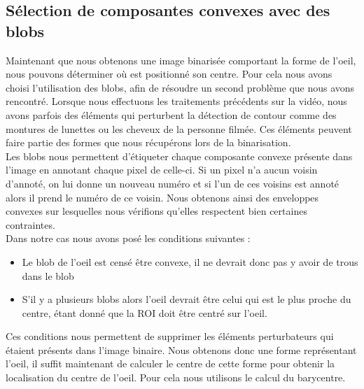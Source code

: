 \subsection{Sélection de composantes convexes avec des blobs}
Maintenant que nous obtenons une image binarisée comportant la forme de l'oeil, nous pouvons déterminer où est
positionné son centre. Pour cela nous avons choisi l'utilisation des blobs, afin de résoudre un second 
problème que nous avons rencontré. Lorsque nous effectuons les traitements précédents sur la vidéo, nous avons
parfois des éléments qui perturbent la détection de contour comme des montures de lunettes ou les cheveux de la personne 
filmée. Ces éléments peuvent faire partie des formes que nous récupérons lors de la binarisation.\\ 

Les blobs nous permettent d'étiqueter chaque composante convexe présente dans l'image en annotant
chaque pixel de celle-ci. Si un pixel n'a aucun voisin d'annoté, on lui donne un nouveau numéro et si
l'un de ces voisins est annoté alors il prend le numéro de ce voisin. Nous obtenons ainsi des enveloppes
convexes sur lesquelles nous vérifions qu'elles respectent bien certaines contraintes.\\

Dans notre cas nous avons posé les conditions suivantes :
\begin{itemize}
 \item Le blob de l'oeil est censé être convexe, il ne devrait donc pas y avoir de trous dans le blob
 \item S'il y a plusieurs blobs alors l'oeil devrait être celui qui est le plus proche du centre, étant
 donné que la ROI doit être centré sur l'oeil.
\end{itemize}
Ces conditions nous permettent de supprimer les éléments perturbateurs qui étaient présents dans l'image binaire.
Nous obtenons donc une forme représentant l'oeil, il suffit maintenant de calculer le centre de cette forme
pour obtenir la localisation du centre de l'oeil. Pour cela nous utilisons le calcul du barycentre.